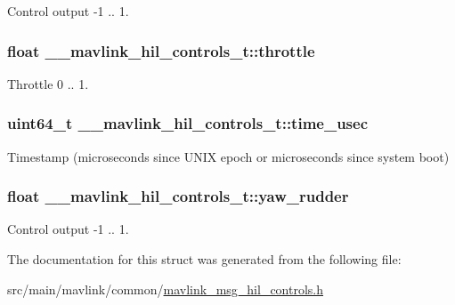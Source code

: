 Control output -\/1 .. 1. 

\hypertarget{struct____mavlink__hil__controls__t_a9249963d6b4959b9cbc952ad86e2a2f1}{
\subsubsection[{throttle}]{\setlength{\rightskip}{0pt plus 5cm}float \+\_\+\+\_\+mavlink\+\_\+hil\+\_\+controls\+\_\+t\+::throttle}}\label{struct____mavlink__hil__controls__t_a9249963d6b4959b9cbc952ad86e2a2f1}


Throttle 0 .. 1. 

\hypertarget{struct____mavlink__hil__controls__t_a209e91b6d93c47abba3dc4ed3c6625f2}{
\subsubsection[{time\+\_\+usec}]{\setlength{\rightskip}{0pt plus 5cm}uint64\+\_\+t \+\_\+\+\_\+mavlink\+\_\+hil\+\_\+controls\+\_\+t\+::time\+\_\+usec}}\label{struct____mavlink__hil__controls__t_a209e91b6d93c47abba3dc4ed3c6625f2}


Timestamp (microseconds since U\+N\+I\+X epoch or microseconds since system boot) 

\hypertarget{struct____mavlink__hil__controls__t_addcaf6167ddb280643e69558a0532dd8}{
\subsubsection[{yaw\+\_\+rudder}]{\setlength{\rightskip}{0pt plus 5cm}float \+\_\+\+\_\+mavlink\+\_\+hil\+\_\+controls\+\_\+t\+::yaw\+\_\+rudder}}\label{struct____mavlink__hil__controls__t_addcaf6167ddb280643e69558a0532dd8}


Control output -\/1 .. 1. 



The documentation for this struct was generated from the following file\+:\begin{DoxyCompactItemize}
\item 
src/main/mavlink/common/\hyperlink{mavlink__msg__hil__controls_8h}{mavlink\+\_\+msg\+\_\+hil\+\_\+controls.\+h}\end{DoxyCompactItemize}
